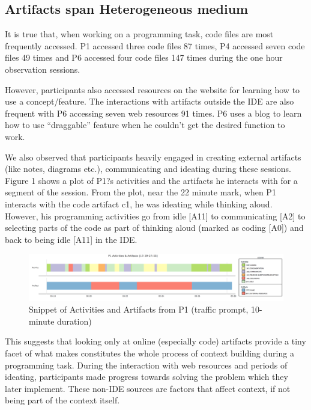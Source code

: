 \subsection{Artifacts span Heterogeneous medium}

It is true that, when working on a programming task, code files are most frequently accessed. P1 accessed three code files 87 times, P4 accessed seven code files 49 times and P6 accessed four code files 147 times during the one hour observation sessions.

However, participants also accessed resources on the website for learning how to use a concept/feature. The interactions with artifacts outside the IDE are also frequent with P6 accessing seven web resources 91 times. P6 uses a blog to learn how to use ``draggable'' feature when he couldn't get the desired function to work.

We also observed that participants heavily engaged in creating external artifacts (like notes, diagrams etc.), communicating and ideating during these sessions. Figure 1 shows a plot of P1?s activities and the artifacts he interacts with for a segment of the session. From the plot, near the 22 minute mark, when P1 interacts with the code artifact c1, he was ideating while thinking aloud. However, his programming activities go from idle [A11] to communicating [A2] to selecting parts of the code as part of thinking aloud (marked as coding [A0]) and back to being idle [A11] in the IDE. 

\begin{figure}
\includegraphics[width=\textwidth]{figures/P1timeplot}
\caption{Snippet of Activities and Artifacts from P1 (traffic prompt, 10-minute duration)}
\end{figure}

This suggests that looking only at online (especially code) artifacts provide a tiny facet of what makes constitutes the whole process of context building during a programming task. During the interaction with web resources and periods of ideating, participants made progress towards solving the problem which they later implement. These non-IDE sources are factors that affect context, if not being part of the context itself.

